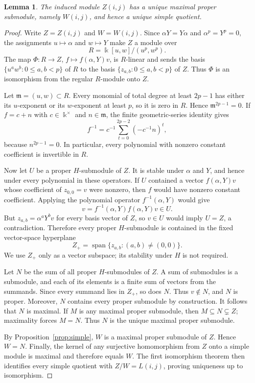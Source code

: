 \documentclass[10pt,oneside]{amsart}
\newcommand{\kk}{\Bbbk}
\newcommand{\Span}{\operatorname{span}}
\newtheorem{lemma}[proposition]{Lemma}
\theoremstyle{definition}
\begin{document}
\begin{lemma}\label{lem:unique}
The induced module $Z(i,j)$ has a unique maximal proper submodule, namely $W(i,j)$, and hence a unique simple quotient.
\end{lemma}
\begin{proof}
Write $Z=Z(i,j)$ and $W=W(i,j)$. Since $\alpha Y=Y\alpha$
and $\alpha^p=Y^p=0$, the assignments $u\mapsto\alpha$ and
$w\mapsto Y$ make $Z$ a module over
\[
 R=\kk[u,w]/(u^p,w^p).
\]
The map $\Phi:R\to Z$, $f\mapsto f(\alpha,Y)v$, is $R$-linear
and sends the basis $\{u^aw^b:0\le a,b<p\}$ of $R$ to the basis
$\{z_{a,b}:0\le a,b<p\}$ of $Z$. Thus $\Phi$ is an isomorphism
from the regular $R$-module onto $Z$.

Let $\mathfrak m=(u,w)\subset R$. Every monomial of total degree
at least $2p-1$ has either its $u$-exponent or its $w$-exponent
at least $p$, so it is zero in $R$. Hence
$\mathfrak m^{2p-1}=0$. If $f=c+n$ with $c\in\kk^{\times}$ and
$n\in\mathfrak m$, the finite geometric-series identity gives
\[
 f^{-1}=c^{-1}\sum_{t=0}^{2p-2}(-c^{-1}n)^t,
\]
because $n^{2p-1}=0$. In particular, every polynomial with
nonzero constant coefficient is invertible in $R$.

Now let $U$ be a proper $H$-submodule of $Z$. It is stable under
$\alpha$ and $Y$, and hence under every polynomial in these
operators. If $U$ contained a vector $f(\alpha,Y)v$ whose
coefficient of $z_{0,0}=v$ were nonzero, then $f$ would have
nonzero constant coefficient. Applying the polynomial operator
$f^{-1}(\alpha,Y)$ would give
\[
 v=f^{-1}(\alpha,Y)f(\alpha,Y)v\in U.
\]
But $z_{a,b}=\alpha^aY^bv$ for every basis vector of $Z$, so
$v\in U$ would imply $U=Z$, a contradiction. Therefore every
proper $H$-submodule is contained in the fixed vector-space
hyperplane
\[
 Z_+=\Span\{z_{a,b}:(a,b)\ne(0,0)\}.
\]
We use $Z_+$ only as a vector subspace; its stability under $H$
is not required.

Let $N$ be the sum of all proper $H$-submodules of $Z$. A sum of
submodules is a submodule, and each of its elements is a finite
sum of vectors from the summands. Since every summand lies in
$Z_+$, so does $N$. Thus $v\notin N$, and $N$ is proper.
Moreover, $N$ contains every proper submodule by construction.
It follows that $N$ is maximal. If $M$ is any maximal
proper submodule, then $M\subseteq N\subsetneq Z$; maximality
forces $M=N$. Thus $N$ is the unique maximal proper submodule.

By Proposition~\ref{prop:simple}, $W$ is a maximal proper
submodule of $Z$. Hence $W=N$. Finally, the kernel of any
surjective homomorphism from $Z$ onto a simple module is maximal
and therefore equals $W$. The first isomorphism theorem then
identifies every simple quotient with $Z/W=L(i,j)$, proving
uniqueness up to isomorphism.
\end{proof}
\end{document}
